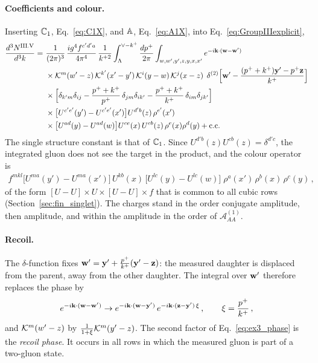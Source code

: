\paragraph{Coefficients and colour.} Inserting $\mathbb{C}_1$, Eq.~\eqref{eq:C1X}, and $\mathbb{A}$, Eq.~\eqref{eq:A1X}, into Eq.~\eqref{eq:GroupIIIexplicit},
\begin{align}\label{eq:ex3_start}
\frac{d^3N^{\rm III.V}}{d^3k}=\ &\frac{1}{(2\pi)^3}\,\frac{ig^4f^{c'd'a}}{4\pi^4}\,\frac{1}{k^{+2}}\int_\Lambda^{\vee-k^+}\frac{dp^+}{2\pi}\int_{w,w',y',z,y,x,x'}e^{-i\v k\cdot(\v w-\v w')}\notag\\
&\times\Kv^m(w'-z)\,\Kv^{k'}(x'-y')\,\Kv^i(y-w)\,\Kv^j(x-z)\;\,\delta^{(2)}\Big[\v w'-\frac{(p^++k^+)\v y'-p^+\v z}{k^+}\Big]\notag\\
&\times\Big[\delta_{k'm}\delta_{ij}-\frac{p^++k^+}{p^+}\,\delta_{jm}\delta_{ik'}-\frac{p^++k^+}{k^+}\,\delta_{im}\delta_{jk'}\Big]\notag\\
&\times\big[U^{c'e'}(y')-U^{c'e'}(x')\big]U^{d'b}(z)\,\rho^{e'}(x')\notag\\
&\times\big[U^{ad}(y)-U^{ad}(w)\big]U^{ce}(x)\,U^{cb}(z)\,\rho^e(x)\rho^d(y)+{\rm c.c.}
\end{align}
The single structure constant is that of $\mathbb{C}_1$. Since $U^{d'b}(z)U^{cb}(z)=\delta^{d'c}$, the integrated gluon does not see the target in the product, and the colour operator is
\begin{align}\label{eq:ex3_colour}
f^{mkl}\big[U^{ma}(y')-U^{ma}(x')\big]\,U^{kb}(x)\,\big[U^{lc}(y)-U^{lc}(w)\big]\;\rho^a(x')\,\rho^b(x)\,\rho^c(y)\,,
\end{align}
of the form $[U-U]\times U\times[U-U]\times f$ that is common to all cubic rows (Section~\ref{sec:fin_singlet}). The charges stand in the order conjugate amplitude, then amplitude, and within the amplitude in the order of $\mathcal A^{(1)}_{AA}$.

\paragraph{Recoil.} The $\delta$-function fixes $\mathbf{w}'=\mathbf{y}'+\frac{p^+}{k^+}(\mathbf{y}'-\mathbf{z})$: the measured daughter is displaced from the parent, away from the other daughter. The integral over $\mathbf{w}'$ therefore replaces the phase by
\begin{align}\label{eq:ex3_phase}
e^{-i\mathbf{k}\cdot(\mathbf{w}-\mathbf{w}')}\to e^{-i\mathbf{k}\cdot(\mathbf{w}-\mathbf{y}')}\,e^{-i\mathbf{k}\cdot(\mathbf{z}-\mathbf{y}')\,\xi}\,,\qquad\xi=\frac{p^+}{k^+}\,,
\end{align}
and $\mathcal{K}^m(w'-z)$ by $\frac{1}{1+\xi}\mathcal{K}^m(y'-z)$. The second factor of Eq.~\eqref{eq:ex3_phase} is the \emph{recoil phase}. It occurs in all rows in which the measured gluon is part of a two-gluon state.

